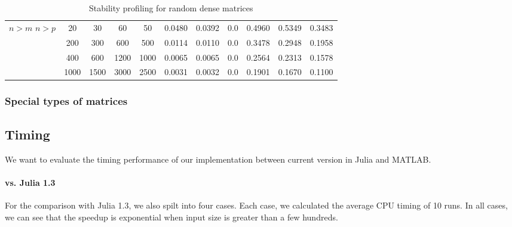 \begin{table}[!htbp]
\begin{tabular}{||c | c | c | c | c || c | c | c | c | c | c||}
         \hline \hline
          & 20 & 30 & 60 & 50 & 0.0480 & 0.0392 & 0.0 & 0.4960 & 0.5349 & 0.3483 \\
         & 200 & 300 & 600 & 500 & 0.0114 & 0.0110 & 0.0 & 0.3478 & 0.2948 & 0.1958 \\
         & 400 & 600 & 1200 & 1000 & 0.0065 & 0.0065 & 0.0 & 0.2564 & 0.2313 & 0.1578\\
         & 1000 & 1500 & 3000 & 2500 & 0.0031 & 0.0032 & 0.0 & 0.1901 & 0.1670 & 0.1100\\
         \hline
        \end{tabular}
        \caption{Stability profiling for random dense matrices}
        \label{tab: sta_test_2}
        \end{table}
    
    \subsubsection{Special types of matrices}
        
    \newpage
    \subsection{Timing}
        We want to evaluate the timing performance of our implementation between current version in Julia and MATLAB. 
        
        \paragraph{vs. Julia 1.3}
        For the comparison with Julia 1.3, we also spilt into four cases. Each case, we calculated the average CPU timing of 10 runs. In all cases, we can see that the speedup is exponential when input size is greater than a few hundreds. 
        
